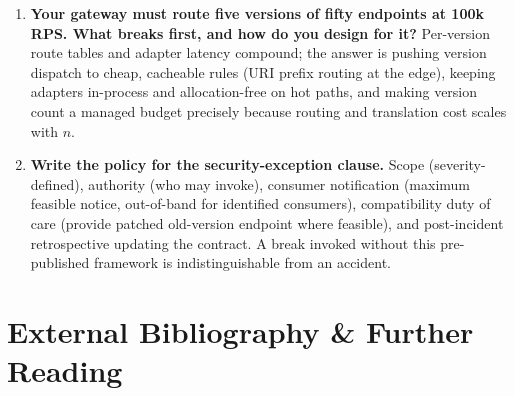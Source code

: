 \begin{enumerate}[label=\textbf{Q\arabic*.}, leftmargin=1.6cm, start=28]
        guides, versioned docs), channel-level (portal banners, newsletter,
        status page), and direct (registry-driven outreach to identified
        top consumers, brownouts for the unresponsive tail). Each layer
        catches the consumers the previous one missed.
  \item \textbf{Your gateway must route five versions of fifty endpoints at
        100k RPS. What breaks first, and how do you design for it?}
        Per-version route tables and adapter latency compound; the answer is
        pushing version dispatch to cheap, cacheable rules (URI prefix
        routing at the edge), keeping adapters in-process and allocation-free
        on hot paths, and making version count a managed budget precisely
        because routing and translation cost scales with $n$.
  \item \textbf{Write the policy for the security-exception clause.}
        Scope (severity-defined), authority (who may invoke), consumer
        notification (maximum feasible notice, out-of-band for identified
        consumers), compatibility duty of care (provide patched old-version
        endpoint where feasible), and post-incident retrospective updating
        the contract. A break invoked without this pre-published framework
        is indistinguishable from an accident.
\end{enumerate}

\section{External Bibliography \& Further Reading}
\label{sec:ch9-bibliography}

